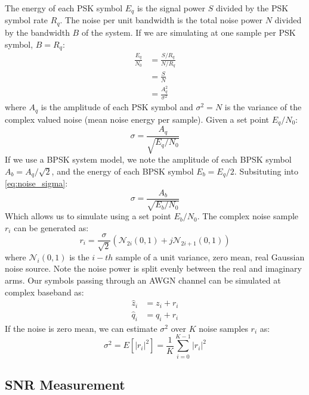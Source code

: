 \documentclass{article}
\begin{document}
The energy of each PSK symbol $E_q$ is the signal power $S$ divided by the PSK symbol rate $R_q$.  The noise per unit bandwidth is the total noise power $N$ divided by the bandwidth $B$ of the system.  If we are simulating at one sample per PSK symbol, $B=R_q$:
\begin{equation}
\begin{split}
\frac{E_q}{N_0} &= \frac{S/R_q}{N/R_q} \\
                &= \frac{S}{N} \\
                &= \frac{A_q^2}{\sigma^2}
\end{split}
\end{equation}
where $A_q$ is the amplitude of each PSK symbol and $\sigma^2=N$ is the variance of the complex valued noise (mean noise energy per sample).  Given a set point $E_q/N_0$:
\begin{equation}
\label{eq:noise_sigma}
\sigma = \frac{A_q}{\sqrt{E_q/N_0}}
\end{equation}
If we use a BPSK system model, we note the amplitude of each BPSK symbol $A_b = A_q/\sqrt{2}$, and the energy of each BPSK symbol $E_b=E_q/2$.  Subsituting into \ref{eq:noise_sigma}:
\begin{equation}
\sigma = \frac{A_b}{\sqrt{E_b/N_0}}
\end{equation}
Which allows us to simulate using a set point $E_b/N_0$.  The complex noise sample $r_i$ can be generated as:
\begin{equation}
r_i = \frac{\sigma}{\sqrt{2}}(\mathcal{N}_{2i}(0,1) + j\mathcal{N}_{2i+1}(0,1))
\end{equation}
where $\mathcal{N}_i(0,1)$ is the $i-th$ sample of a unit variance, zero mean, real Gaussian noise source.  Note the noise power is split evenly between the real and imaginary arms. Our symbols passing through an AWGN channel can be simulated at complex baseband as:
\begin{equation}
\begin{split}
\hat{z}_i &= z_i + r_i \\
\hat{q}_i &= q_i + r_i
\end{split}
\end{equation}
If the noise is zero mean, we can estimate $\sigma^2$ over $K$ noise samples $r_i$ as:
\begin{equation}
\sigma^2 = E[|r_i|^2] = \frac{1}{K}\sum_{i=0}^{K-1}|r_i|^2 
\end{equation}

\subsection{SNR Measurement}
\end{document}
